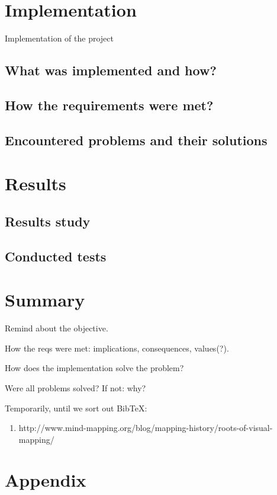 \documentclass[american]{bsc}
\begin{document}
\chapter{Implementation}
\label{chap:implementation}

Implementation of the project

\section{What was implemented and how?}
\label{implwhat}

\section{How the requirements were met?}
\label{implrequirements}

\section{Encountered problems and their solutions}
\label{implproblems}

\chapter{Results}
\label{chap:results}

\section{Results study}
\label{sec:resstudy}

\section{Conducted tests}
\label{sec:tests}

\chapter{Summary}
\label{chap:summary}

Remind about the objective.

How the reqs were met: implications, consequences, values(?).

How does the implementation solve the problem?

Were all problems solved? If not: why?




Temporarily, until we sort out BibTeX:

\begin{enumerate}
	\item http://www.mind-mapping.org/blog/mapping-history/roots-of-visual-mapping/
\end{enumerate}

\appendix

\chapter{Appendix}
\label{chap:appendix}
\end{document}
